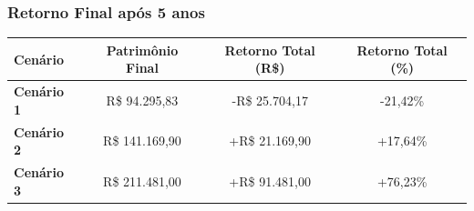 \begin{frame}[c]\frametitle{Retorno Final após 5 anos}
  \begin{tabular}{|l|c|c|c|}
    \hline
    \textbf{Cenário}   & \textbf{Patrimônio Final} & \textbf{Retorno Total (R\$)} & \textbf{Retorno Total (\%)} \\
    \hline
    \textbf{Cenário 1} & R\$ 94.295,83             & -R\$ 25.704,17               & -21,42\%                    \\
    \textbf{Cenário 2} & R\$ 141.169,90            & +R\$ 21.169,90               & +17,64\%                    \\
    \textbf{Cenário 3} & R\$ 211.481,00            & +R\$ 91.481,00               & +76,23\%                    \\
    \hline
  \end{tabular}
\end{frame}